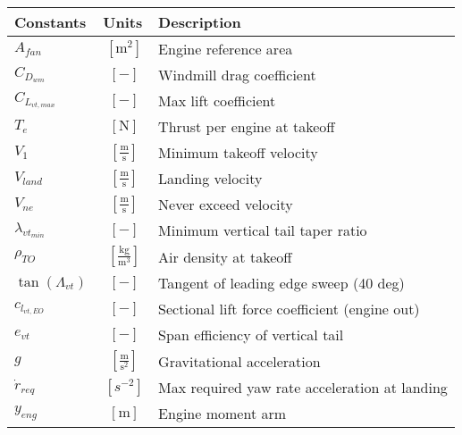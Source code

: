 \documentclass[12pt]{article}
\begin{document}
{\footnotesize
\begin{supertabular}{lcl}
\toprule
Constants & Units & Description \\ \midrule
$A_{fan}$ & $~\mathrm{[m^{2}]}$ & Engine reference area \\
$C_{D_{wm}}$ & $~[-]$ & Windmill drag coefficient \\
$C_{L_{vt,max}}$ & $~[-]$ & Max lift coefficient \\
$T_e$ & $~\mathrm{[N]}$ & Thrust per engine at takeoff \\
$V_1$ & $~\mathrm{[\tfrac{m}{s}]}$ & Minimum takeoff velocity \\
$V_{land}$ & $~\mathrm{[\tfrac{m}{s}]}$ & Landing velocity \\
$V_{ne}$ & $~\mathrm{[\tfrac{m}{s}]}$ & Never exceed velocity \\
$\lambda_{vt_{min}}$ & $~[-]$ & Minimum vertical tail taper ratio \\
$\rho_{TO}$ & $~\mathrm{[\tfrac{kg}{m^{3}}]}$ & Air density at takeoff \\
$\tan(\Lambda_{vt})$ & $~[-]$ & Tangent of leading edge sweep (40 deg) \\
$c_{l_{vt,EO}}$ & $~[-]$ & Sectional lift force coefficient (engine out) \\
$e_{vt}$ & $~[-]$ & Span efficiency of vertical tail \\
$g$ & $~\mathrm{[\tfrac{m}{s^{2}}]}$ & Gravitational acceleration \\
$\dot{r}_{req}$ & $~[s^{-2}]$ & Max required yaw rate acceleration at landing\\
$y_{eng}$ & $~\mathrm{[m]}$ & Engine moment arm \\
\bottomrule
\end{supertabular}}

 
\end{document}
